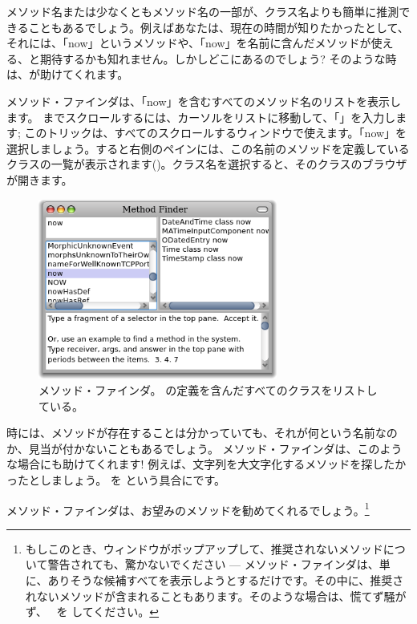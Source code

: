 \documentclass[a4paper,10pt,twoside]{book}
\begin{document}
メソッド名または少なくともメソッド名の一部が、クラス名よりも簡単に推測できることもあるでしょう。例えばあなたは、現在の時間が知りたかったとして、それには、「now」というメソッドや、「now」を名前に含んだメソッドが使える、と期待するかも知れません。しかしどこにあるのでしょう?
そのような時は、が助けてくれます。

メソッド・ファインダは、「now」を含むすべてのメソッド名のリストを表示します。
 までスクロールするには、カーソルをリストに移動して、「」を入力します; このトリックは、すべてのスクロールするウィンドウで使えます。「now」を選択しましょう。すると右側のペインには、この名前のメソッドを定義しているクラスの一覧が表示されます()。クラス名を選択すると、そのクラスのブラウザが開きます。

\begin{figure}[hbt]
\centerline {\includegraphics[width=0.7\textwidth]{methodFinder-now}}
\caption{メソッド・ファインダ。 の定義を含んだすべてのクラスをリストしている。
}
\end{figure}

時には、メソッドが存在することは分かっていても、それが何という名前なのか、見当が付かないこともあるでしょう。
メソッド・ファインダは、このような場合にも助けてくれます! 例えば、文字列を大文字化するメソッドを探したかったとしましょう。 を  という具合にです。

\noindent
メソッド・ファインダは、お望みのメソッドを勧めてくれるでしょう。\footnote{もしこのとき、ウィンドウがポップアップして、推奨されないメソッドについて警告されても、驚かないでください --- メソッド・ファインダは、単に、ありそうな候補すべてを表示しようとするだけです。その中に、推奨されないメソッドが含まれることもあります。そのような場合は、慌てず騒がず、~ を \click してください。}
\end{document}
